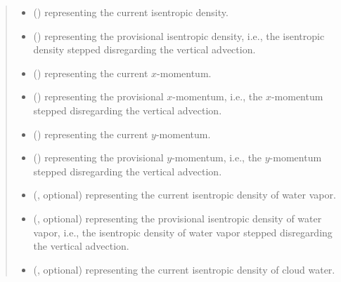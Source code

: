 \documentclass[letterpaper,10pt,english]{sphinxmanual}
\begin{document}
\begin{fulllineitems}
\begin{fulllineitems}
\begin{quote}
\begin{description}
\begin{itemize}
\item {} 
 () \textendash{}  representing the current isentropic density.

\item {} 
 () \textendash{}  representing the provisional isentropic density, i.e., the isentropic density stepped
disregarding the vertical advection.

\item {} 
 () \textendash{}  representing the current \(x\)-momentum.

\item {} 
 () \textendash{}  representing the provisional \(x\)-momentum, i.e., the \(x\)-momentum stepped
disregarding the vertical advection.

\item {} 
 () \textendash{}  representing the current \(y\)-momentum.

\item {} 
 () \textendash{}  representing the provisional \(y\)-momentum, i.e., the \(y\)-momentum stepped
disregarding the vertical advection.

\item {} 
 (, optional) \textendash{}  representing the current isentropic density of water vapor.

\item {} 
 (, optional) \textendash{}  representing the provisional isentropic density of water vapor,
i.e., the isentropic density of water vapor stepped disregarding the vertical advection.

\item {} 
 (, optional) \textendash{}  representing the current isentropic density of cloud water.


\end{itemize}
\end{description}
\end{quote}
\end{fulllineitems}
\end{fulllineitems}
\end{document}
